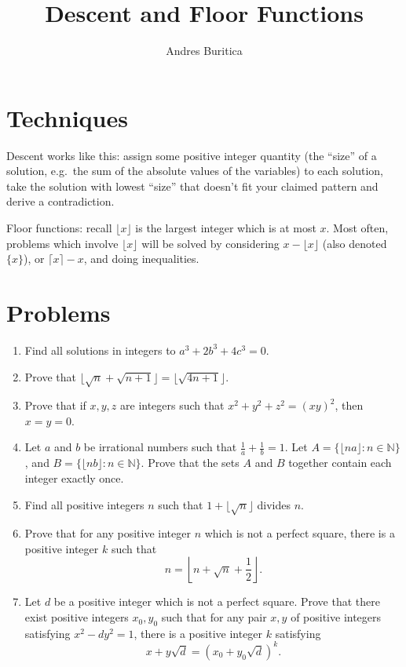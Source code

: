 \documentclass{article}
\title{Descent and Floor Functions}
\author{Andres Buritica}
\date{}
\begin{document}
\maketitle
\section{Techniques}
  Descent works like this: assign some positive integer quantity
  (the ``size'' of a solution, e.g.\ the sum of the absolute values of the
  variables) to each solution, take the solution with lowest
  ``size'' that doesn't fit your claimed pattern and derive a contradiction.

  Floor functions: recall $\lfloor x\rfloor$ is the largest integer which is at
  most $x$. Most often, problems which involve $\lfloor x\rfloor$ will be
  solved by considering $x-\lfloor x\rfloor$ (also denoted $\{x\}$), or $\lceil
  x\rceil-x$, and doing inequalities.
\section{Problems}
\begin{enumerate}
  \item Find all solutions in integers to $a^3+2b^3+4c^3=0$.
  \item Prove that $\lfloor\sqrt n+\sqrt{n+1}\rfloor=\lfloor\sqrt{4n+1}\rfloor$.
  \item Prove that if $x, y, z$ are integers such that $x^2+y^2+z^2=(xy)^2$,
      then $x=y=0$.
  \item Let $a$ and $b$ be irrational numbers such that $\frac 1a+\frac 1b=1$.
    Let $A=\{\lfloor na\rfloor: n\in\mathbb N\}$, and $B=\{\lfloor nb\rfloor:
    n\in\mathbb N\}$. Prove that the sets $A$ and $B$ together contain each
    integer exactly once.
  \item Find all positive integers $n$ such that $1+\lfloor\sqrt n\rfloor$
    divides $n$.
  \item Prove that for any positive integer $n$ which is not a perfect square,
    there is a positive integer $k$ such that
    \[n=\left\lfloor n+\sqrt n+\frac12\right\rfloor.\]
  \item Let $d$ be a positive integer which is not a perfect square. Prove that
      there exist positive integers $x_0,y_0$ such that for any pair $x,y$ of
      positive integers satisfying $x^2-dy^2=1$, there is a positive integer $k$
      satisfying
      \[x+y\sqrt d=(x_0+y_0\sqrt d)^k.\]
\end{enumerate}
\newpage
\end{document}

